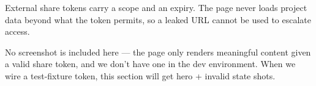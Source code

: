 \begin{integritynote}
External share tokens carry a scope and an expiry. The page never loads
project data beyond what the token permits, so a leaked URL cannot be
used to escalate access.
\end{integritynote}

\begin{designnote}
No screenshot is included here — the page only renders meaningful content
given a valid share token, and we don't have one in the dev environment.
When we wire a test-fixture token, this section will get hero + invalid
state shots.
\end{designnote}
